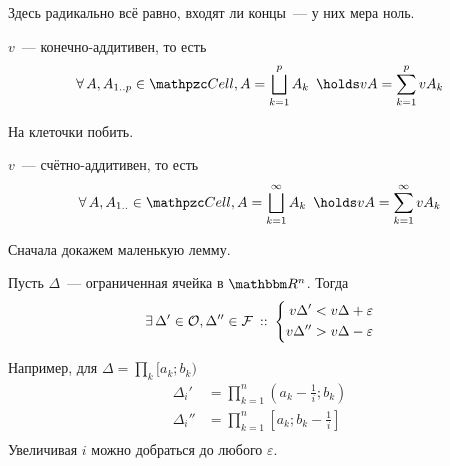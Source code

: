 \documentclass[draft, timbord]{longnotes}
\begin{document}
\begin{rem*}
  Здесь радикально всё равно, входят ли концы~--- у них мера ноль. 
\end{rem*}

\begin{thrm}\label{thrm:meas::ledeg::finadd}
  $v$~--- конечно-аддитивен, то есть \[
    \forall\, A, A_{1 \intrng p} \in \Cell\, , A = \bigsqcup_{k=1}^p A_k
    \:\; \holds  vA = \sum_{k=1}^p v A_k
  \]
\end{thrm}
\begin{tproof}
  На клеточки побить.
\end{tproof}

\begin{thrm}\label{thrm:meas::ledeg::infadd}
  $v$~--- счётно-аддитивен, то есть \[
    \forall\, A, A_{1 \intrng } \in \Cell\, , A = \bigsqcup_{k=1}^\infty  A_k
    \:\; \holds  vA = \sum_{k=1}^ \infty  v A_k
  \]
\end{thrm}
Сначала докажем маленькую лемму.
\begin{lem}\label{lem:meas::ledeg::openclcell}
  Пусть $\Delta$~--- ограниченная ячейка в $\R^n$. Тогда 
  \[
    \exists\, \Delta' \in \mathcal O, \Delta'' \in \mathcal F 
    \:::\: 
    \left\{
      \begin{aligned}
        v \Delta'  &< v \Delta + \varepsilon  \\
        v \Delta'' &> v \Delta - \varepsilon 
      \end{aligned}
    \right.
  \]
\end{lem}
\begin{lproof}
  Например, для $\Delta = \prod_k [a_k; b_k)$ \[
    \begin{split}
      \Delta_i'  &= \prod_{k=1}^n \left(a_k-\frac 1 i ; b_k\right) \\
      \Delta_i'' &= \prod_{k=1}^n \left[a_k ; b_k - \frac 1 i\right] \\
    \end{split}
  \]
  Увеличивая $i$ можно добраться до любого $\varepsilon$.
\end{lproof}
\end{document}
